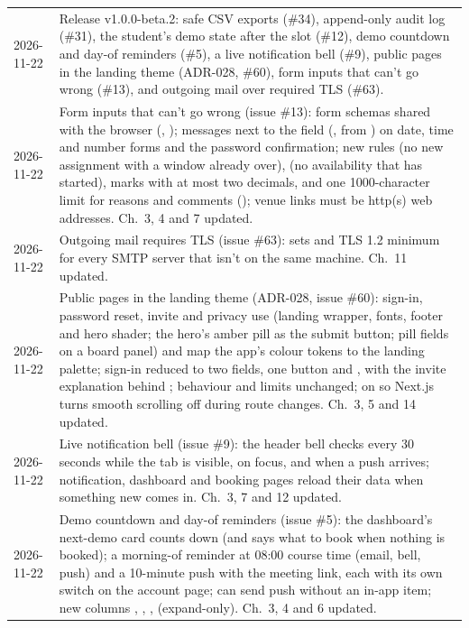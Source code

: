 \begin{xltabular}{\linewidth}{@{}l L@{}}
  2026-11-22 & Release v1.0.0-beta.2: safe CSV exports (\#34), append-only audit log (\#31), the student's demo state after the slot (\#12), demo countdown and day-of reminders (\#5), a live notification bell (\#9), public pages in the landing theme (ADR-028, \#60), form inputs that can't go wrong (\#13), and outgoing mail over required TLS (\#63).\\
  2026-11-22 & Form inputs that can't go wrong (issue \#13): form schemas shared with the browser (, ); messages next to the field (,  from ) on date, time and number forms and the password confirmation; new rules  (no new assignment with a window already over),  (no availability that has started), marks with at most two decimals, and one 1000-character limit for reasons and comments (); venue links must be http(s) web addresses. Ch.~3, 4 and 7 updated.\\
  2026-11-22 & Outgoing mail requires TLS (issue \#63):  sets  and TLS 1.2 minimum for every SMTP server that isn't on the same machine. Ch.~11 updated.\\
  2026-11-22 & Public pages in the landing theme (ADR-028, issue \#60): sign-in, password reset, invite and privacy use  (landing wrapper, fonts, footer and hero shader; the hero's amber pill as the submit button; pill fields on a board panel) and map the app's colour tokens to the landing palette; sign-in reduced to two fields, one button and , with the invite explanation behind ; behaviour and limits unchanged;  on  so Next.js turns smooth scrolling off during route changes. Ch.~3, 5 and 14 updated.\\
  2026-11-22 & Live notification bell (issue \#9): the header bell checks  every 30 seconds while the tab is visible, on focus, and when a push arrives; notification, dashboard and booking pages reload their data when something new comes in. Ch.~3, 7 and 12 updated.\\
  2026-11-22 & Demo countdown and day-of reminders (issue \#5): the dashboard's next-demo card counts down (and says what to book when nothing is booked); a morning-of reminder at 08:00 course time (email, bell, push) and a 10-minute push with the meeting link, each with its own switch on the account page;  can send push without an in-app item; new columns , , ,  (expand-only). Ch.~3, 4 and 6 updated.\\

\end{xltabular}
